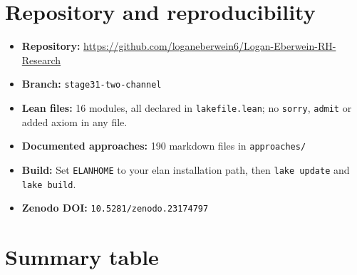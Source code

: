 \documentclass[11pt]{article}
\theoremstyle{remark}
\DeclareRobustCommand{\_}{\ifmmode\text{\textunderscore}\else\textunderscore\allowbreak\fi}
\begin{document}
\section{Repository and reproducibility}

\begin{itemize}
\item \textbf{Repository:} \url{https://github.com/loganeberwein6/Logan-Eberwein-RH-Research}
\item \textbf{Branch:} \texttt{stage31-two-channel}
\item \textbf{Lean files:} 16 modules, all declared in \texttt{lakefile.lean}; no \texttt{sorry}, \texttt{admit} or added axiom in any file.
\item \textbf{Documented approaches:} 190 markdown files in \texttt{approaches/}
\item \textbf{Build:} Set \texttt{ELAN\_HOME} to your elan installation path, then \texttt{lake update} and \texttt{lake build}.
\item \textbf{Zenodo DOI:} \texttt{10.5281/zenodo.23174797}
\end{itemize}

\section{Summary table}
\end{document}
